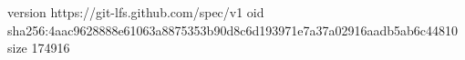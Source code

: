 version https://git-lfs.github.com/spec/v1
oid sha256:4aac9628888e61063a8875353b90d8c6d193971e7a37a02916aadb5ab6c44810
size 174916
